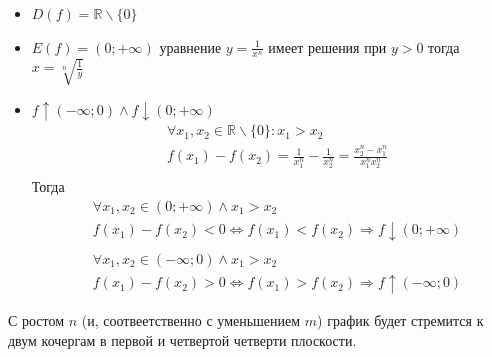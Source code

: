 \begin{itemize}
    \item $D(f) = \mathbb{R} \backslash \{0\}$
    \item $E(f) = (0; +\infty)$ уравнение $y = \frac{1}{x^n}$ имеет решения при $y > 0$ тогда $x = \sqrt[n]{\frac{1}{y}}$
    \item $f \uparrow (-\infty; 0) \land f \downarrow (0; +\infty)$
    \begin{align*}
        &\forall x_1, x_2 \in \mathbb{R} \backslash \{0\}: x_1 > x_2 \\
        &f(x_1) - f(x_2) = \frac{1}{x_1^n} - \frac{1}{x_2^n} = \frac{x_2^n - x_1^n}{x_1^n x_2^n}\\
    \end{align*}
    Тогда
    \begin{align*}
        &\forall x_1, x_2 \in (0; +\infty) \land x_1 > x_2 \\
        & f(x_1) - f(x_2) < 0 \iff f(x_1) < f(x_2) \Rightarrow f \downarrow (0; +\infty) \\ \\
        &\forall x_1, x_2 \in (-\infty; 0) \land x_1 > x_2 \\
        & f(x_1) - f(x_2) > 0 \iff f(x_1) > f(x_2) \Rightarrow f \uparrow (-\infty; 0)
    \end{align*}
\end{itemize}

\break

\begin{remark}
    С ростом $n$ (и, соотвеетственно с уменьшением $m$) график будет стремится к двум кочергам в первой и четвертой четверти плоскости.
\end{remark}

